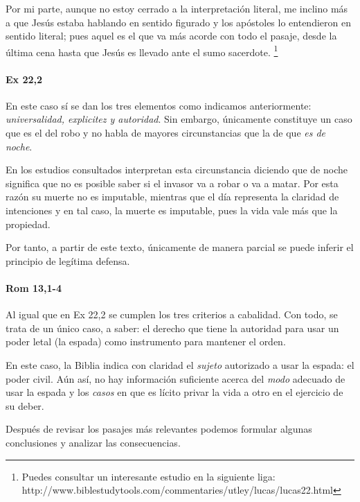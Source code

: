 \documentclass{article}
\begin{document}
Por mi parte, aunque no estoy cerrado a la interpretaci\'on literal, me inclino m\'as a que Jes\'us estaba hablando en sentido figurado y los ap\'ostoles lo entendieron en sentido literal; pues aquel es el que va m\'as acorde con todo el pasaje, desde la \'ultima cena hasta que Jes\'us es llevado ante el sumo sacerdote.%
    \footnote{Puedes consultar un interesante estudio en la siguiente liga: \\ http://www.biblestudytools.com/commentaries/utley/lucas/lucas22.html}

\paragraph{Ex 22,2}

En este caso s\'{i} se dan los tres elementos como indicamos anteriormente: \emph{universalidad, explicitez y autoridad}. Sin embargo, \'unicamente constituye un caso que es el del robo y no habla de mayores circunstancias que la de que \emph{es de noche}.

En los estudios consultados interpretan esta circunstancia diciendo que de noche significa que no es posible saber si el invasor va a robar o va a matar. Por esta raz\'on su muerte no es imputable, mientras que el d\'{i}a representa la claridad de intenciones y en tal caso, la muerte es imputable, pues la vida vale m\'as que la propiedad.

Por tanto, a partir de este texto, \'unicamente de manera parcial se puede inferir el principio de leg\'{i}tima defensa.

\paragraph{Rom 13,1-4}

Al igual que en Ex 22,2 se cumplen los tres criterios a cabalidad. Con todo, se trata de un \'unico caso, a saber: el derecho que tiene la autoridad para usar un poder letal (la espada) como instrumento para mantener el orden.

En este caso, la Biblia indica con claridad el \emph{sujeto} autorizado a usar la espada: el poder civil. A\'un as\'{i}, no hay informaci\'on suficiente acerca del \emph{modo} adecuado de usar la espada y los \emph{casos} en que es l\'{i}cito privar la vida a otro en el ejercicio de su deber.

Despu\'es de revisar los pasajes m\'as relevantes podemos formular algunas conclusiones y analizar las consecuencias.
\end{document}
